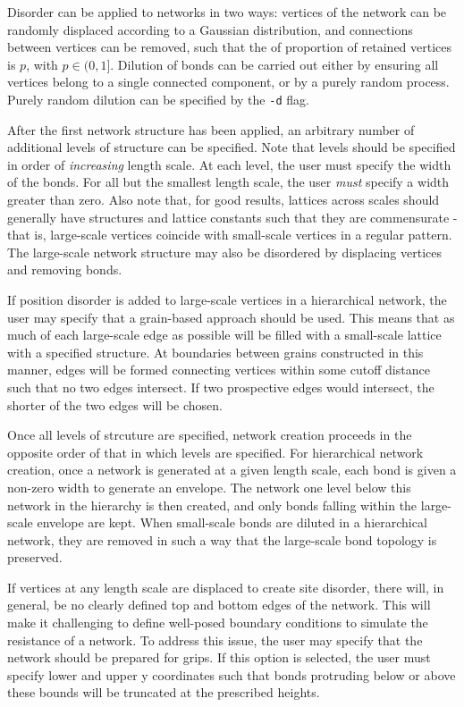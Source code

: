 \documentclass{article}
\begin{document}
Disorder can be applied to networks in two ways: vertices of the network can be
randomly displaced according to a Gaussian distribution, and connections between
vertices can be removed, such that the of proportion of retained vertices is 
$p$, with $p \in (0, 1]$. Dilution of bonds can be carried out either by 
ensuring all vertices belong to a single connected component, or by a purely 
random process. Purely random dilution can be specified by the \texttt{-d} flag.

After the first network structure has been applied, an arbitrary number of 
additional levels of structure can be specified. Note that levels should
be specified in order of \emph{increasing} length scale. At each level, the
user must specify the width of the bonds. For all but the smallest length
scale, the user \emph{must} specify a width greater than zero. Also note that,
for good results, lattices across scales should generally have structures and
lattice constants such that they are commensurate - that is, large-scale
vertices coincide with small-scale vertices in a regular pattern. The 
large-scale network structure may also be disordered by displacing vertices
and removing bonds.

If position disorder is added to large-scale vertices in a hierarchical
network, the user may specify that a grain-based approach should be used.
This means that as much of each large-scale edge as possible will be filled with
a small-scale lattice with a specified structure. At boundaries between
grains constructed in this manner, edges will be formed connecting vertices
within some cutoff distance such that no two edges intersect. If two
prospective edges would intersect, the shorter of the two edges will be chosen.

Once all levels of strcuture are specified, network creation proceeds in
the opposite order of that in which levels are specified. For hierarchical
network creation, once a network is generated at a given length scale, each
bond is given a non-zero width to generate an envelope. The network one level
below this network in the hierarchy is then created, and only bonds falling
within the large-scale envelope are kept. When small-scale bonds are diluted in
a hierarchical network, they are removed in such a way that the large-scale bond
topology is preserved.

If vertices at any length scale are displaced to create site disorder, there
will, in general, be no clearly defined top and bottom edges of the network.
This will make it challenging to define well-posed boundary conditions to
simulate the resistance of a network. To address this issue, the user may
specify that the network should be prepared for grips. If this option is
selected, the user must specify lower and upper y coordinates such that
bonds protruding below or above these bounds will be truncated at the
prescribed heights.
\end{document}
